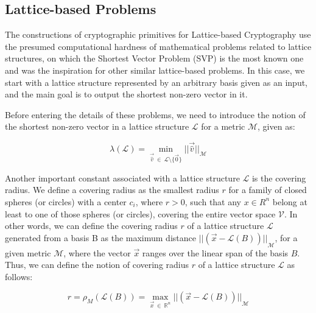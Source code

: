 \documentclass[runningheads]{llncs}
\numberwithin{equation}{section}
\begin{document}
    \subsection{Lattice-based Problems}
    \label{subsec:lattice-based-problems}

    The constructions of cryptographic primitives for Lattice-based Cryptography use the presumed computational hardness of mathematical problems related to lattice structures, on which the Shortest Vector Problem (SVP) is the most known one and was the inspiration for other similar lattice-based problems. In this case, we start with a lattice structure represented by an arbitrary basis given as an input, and the main goal is to output the shortest non-zero vector in it.

    \vspace{1ex}
    
    \noindent Before entering the details of these problems, we need to introduce the notion of the shortest non-zero vector in a lattice structure $\mathcal{L}$ for a metric $\mathcal{M}$, given as:

    \begin{equation}
        \lambda(\mathcal{L}) = \min_{\Vec{\hat{v}}\ \in\ \mathcal{L} \setminus \{ \Vec{0} \} } {||\Vec{\hat{v}}||}_{\mathcal{M}}
        \label{equ:shortest-non-zero-vector-in-lattice}
    \end{equation}
    \vspace{1ex}

    \noindent
    
    \noindent Another important constant associated with a lattice structure $\mathcal{L}$ is the covering radius. We define a covering radius as the smallest radius $r$ for a family of closed spheres (or circles) with a center ${c}_{i}$, where $r > 0$, such that any $x \in {R}^{n}$ belong at least to one of those spheres (or circles), covering the entire vector space $\mathcal{V}$. In other words, we can define the covering radius $r$ of a lattice structure $\mathcal{L}$ generated from a basis B as the maximum distance ${|| (\Vec{x} - \mathcal{L}(B) ) ||}_{\mathcal{M}}$, for a given metric $\mathcal{M}$, where the vector $\Vec{x}$ ranges over the linear span of the basis $B$. Thus, we can define the notion of covering radius $r$ of a lattice structure $\mathcal{L}$ as follows:

    \begin{equation}
        r = {\rho}_{M}(\mathcal{L}(B)) = \max_{\Vec{x}\ \in\ {\mathbb{R}}^{n}} {|| (\Vec{x} - \mathcal{L}(B) ) ||}_{\mathcal{M}}
        \label{equ:covering-radius-in-lattice}
    \end{equation}
    \vspace{1ex}
\end{document}
